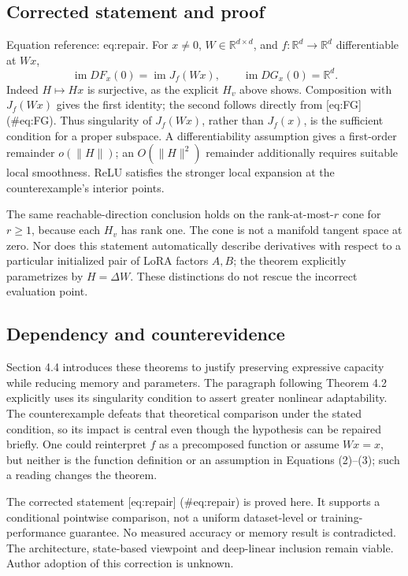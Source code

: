 \documentclass[10pt]{article}
\begin{document}
\subsection*{Corrected statement and proof}
Equation reference: eq:repair. For \(x\ne0\), \(W\in\mathbb R^{d\times d}\), and \(f:\mathbb R^d\to
\mathbb R^d\) differentiable at \(Wx\), \[
\operatorname{im}DF_x(0)=\operatorname{im}J_f(Wx),\qquad
\operatorname{im}DG_x(0)=\mathbb R^d.\] Indeed \(H\mapsto Hx\) is surjective, as the explicit \(H_v\) above shows. Composition with \(J_f(Wx)\) gives the first identity; the second follows directly from [eq:FG] (\#eq:FG). Thus singularity of \(J_f(Wx)\), rather than \(J_f(x)\), is the sufficient condition for a proper subspace. A differentiability assumption gives a first-order remainder \(o(\|H\|)\); an \(O(\|H\|^2)\) remainder additionally requires suitable local smoothness. ReLU satisfies the stronger local expansion at the counterexample’s interior points.\par
The same reachable-direction conclusion holds on the rank-at-most-\(r\) cone for \(r\ge1\), because each \(H_v\) has rank one. The cone is not a manifold tangent space at zero. Nor does this statement automatically describe derivatives with respect to a particular initialized pair of LoRA factors \(A,B\); the theorem explicitly parametrizes by \(H=\Delta W\). These distinctions do not rescue the incorrect evaluation point.\par
\subsection*{Dependency and counterevidence}
Section 4.4 introduces these theorems to justify preserving expressive capacity while reducing memory and parameters. The paragraph following Theorem 4.2 explicitly uses its singularity condition to assert greater nonlinear adaptability. The counterexample defeats that theoretical comparison under the stated condition, so its impact is central even though the hypothesis can be repaired briefly. One could reinterpret \(f\) as a precomposed function or assume \(Wx=x\), but neither is the function definition or an assumption in Equations (2)–(3); such a reading changes the theorem.\par
The corrected statement [eq:repair] (\#eq:repair) is proved here. It supports a conditional pointwise comparison, not a uniform dataset-level or training-performance guarantee. No measured accuracy or memory result is contradicted. The architecture, state-based viewpoint and deep-linear inclusion remain viable. Author adoption of this correction is unknown.\par
\end{document}
